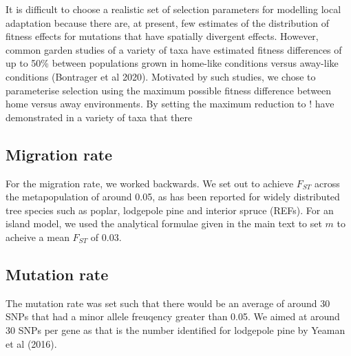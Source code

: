 \documentclass[10pt,twoside,lineno, twocolumn]{GSA_format}
\begin{document}
It is difficult to choose a realistic set of selection parameters for modelling local adaptation because there are, at present, few estimates of the distribution of fitness effects for mutations that have spatially divergent effects. However, common garden studies of a variety of taxa have estimated fitness differences of up to 50\% between populations grown in home-like conditions versus away-like conditions (Bontrager et al 2020). Motivated by such studies, we chose to parameterise selection using the maximum possible fitness difference between home versus away environments. By setting the maximum reduction to $!$
have demonstrated in a variety of taxa that there 

\subsection{Migration rate} 

For the migration rate, we worked backwards. We set out to achieve $F_{ST}$ across the metapopulation of around 0.05, as has been reported for widely distributed tree species such as poplar, lodgepole pine and interior spruce (REFs). For an island model, we used the analytical formulae given in the main text to set $m$ to acheive a mean $F_{ST}$ of 0.03.

\subsection{Mutation rate} 

The mutation rate was set such that there would be an average of around 30 SNPs that had  a minor allele freuqency greater than 0.05. We aimed at around 30 SNPs per gene as that is the number identified for lodgepole pine by Yeaman et al (2016).
\pagebreak
\end{document}
